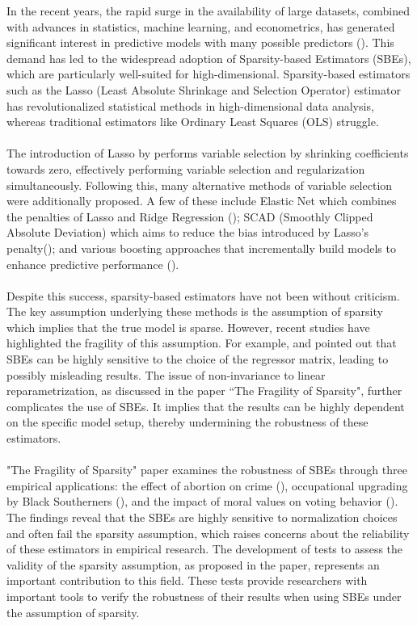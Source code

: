 In the recent years, the rapid surge in the availability of large datasets,  combined with advances in statistics, machine learning, and econometrics, has generated significant interest in predictive models with many possible predictors (\cite{illusitionOfSparsity}). This demand has led to the widespread adoption of Sparsity-based Estimators (SBEs), which are particularly well-suited for high-dimensional. Sparsity-based estimators such as the Lasso (Least Absolute Shrinkage and Selection Operator) estimator has revolutionalized statistical methods in high-dimensional data analysis, whereas traditional estimators like Ordinary Least Squares (OLS) struggle. \\
\\
The introduction of Lasso by \cite{lasso} performs variable selection by shrinking coefficients towards zero, effectively performing variable selection and regularization simultaneously. Following this, many alternative methods of variable selection were additionally proposed. A few of these include Elastic Net which combines the penalties of Lasso and Ridge Regression (\cite{elasticNet}); SCAD (Smoothly Clipped Absolute Deviation) which aims to reduce the bias introduced by Lasso's penalty(\cite{SCAD}); and various boosting approaches  that incrementally build models to enhance predictive performance (\cite{boostingApproaches}).\\
\\
Despite this success, sparsity-based estimators have not been without criticism. The key assumption underlying these methods is the assumption of sparsity which implies that the true model is sparse. However, recent studies have highlighted the fragility of this assumption. For example, \cite{giannone2021economic} and \cite{wuthrich2023omitted} pointed out that SBEs can be highly sensitive to the choice of the regressor matrix, leading to possibly misleading results. The issue of non-invariance to linear reparametrization, as discussed in the paper ``The Fragility of Sparsity", further complicates the use of SBEs. It implies that the results can be highly dependent on the specific model setup, thereby undermining the robustness of these estimators. \\
\\
"The Fragility of Sparsity" paper examines the robustness of SBEs through three empirical applications: the effect of abortion on crime (\cite{abortionCrime}), occupational upgrading by Black Southerners (\cite{blackWW2}), and the impact of moral values on voting behavior (\cite{votingMoral}). The findings reveal that the SBEs are highly sensitive to normalization choices and often fail the sparsity assumption, which raises concerns about the reliability of these estimators in empirical research. The development of tests to assess the validity of the sparsity assumption, as proposed in the paper, represents an important contribution to this field. These tests provide researchers with important tools to verify the robustness of their results when using SBEs under the assumption of sparsity.
